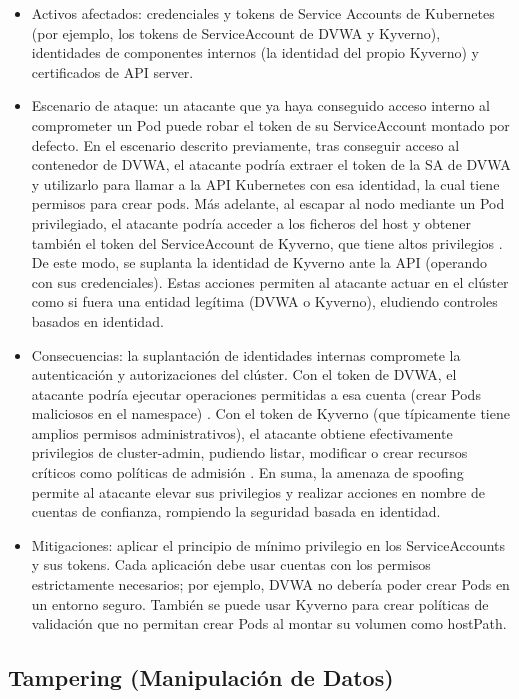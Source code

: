 \documentclass[12pt,twoside,titlepage]{report}
\begin{document}
\begin{itemize}
    \item Activos afectados: credenciales y tokens de Service Accounts de Kubernetes (por ejemplo, los tokens de ServiceAccount de DVWA y Kyverno), identidades de componentes internos (la identidad del propio Kyverno) y certificados de API server. 
    \item Escenario de ataque: un atacante que ya haya conseguido acceso interno al comprometer un Pod puede robar el token de su ServiceAccount montado por defecto. En el escenario descrito previamente, tras conseguir acceso al contenedor de DVWA, el atacante podría extraer el token de la SA de DVWA y utilizarlo para llamar a la API Kubernetes con esa identidad, la cual tiene permisos para crear pods. Más adelante, al escapar al nodo mediante un Pod privilegiado, el atacante podría acceder a los ficheros del host y obtener también el token del ServiceAccount de Kyverno, que tiene altos privilegios . De este modo, se suplanta la identidad de Kyverno ante la API (operando con sus credenciales). Estas acciones permiten al atacante actuar en el clúster como si fuera una entidad legítima (DVWA o Kyverno), eludiendo controles basados en identidad.
    \item Consecuencias: la suplantación de identidades internas compromete la autenticación y autorizaciones del clúster. Con el token de DVWA, el atacante podría ejecutar operaciones permitidas a esa cuenta (crear Pods maliciosos en el namespace) . Con el token de Kyverno (que típicamente tiene amplios permisos administrativos), el atacante obtiene efectivamente privilegios de cluster-admin, pudiendo listar, modificar o crear recursos críticos como políticas de admisión . En suma, la amenaza de spoofing permite al atacante elevar sus privilegios y realizar acciones en nombre de cuentas de confianza, rompiendo la seguridad basada en identidad. 
    \item Mitigaciones: aplicar el principio de mínimo privilegio en los ServiceAccounts y sus tokens. Cada aplicación debe usar cuentas con los permisos estrictamente necesarios; por ejemplo, DVWA no debería poder crear Pods en un entorno seguro. También se puede usar Kyverno para crear políticas de validación que no permitan crear Pods al montar su volumen como hostPath.
\end{itemize}

\subsection{Tampering (Manipulación de Datos)}
\end{document}
